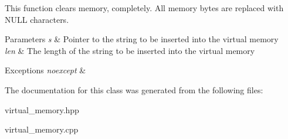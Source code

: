 This function clears memory, completely. All memory bytes are replaced with N\+U\+LL characters. 
\begin{DoxyParams}{Parameters}
{\em s} & Pointer to the string to be inserted into the virtual memory \\
\hline
{\em len} & The length of the string to be inserted into the virtual memory \\
\hline
\end{DoxyParams}

\begin{DoxyExceptions}{Exceptions}
{\em noexcept} & \\
\hline
\end{DoxyExceptions}


The documentation for this class was generated from the following files\+:\begin{DoxyCompactItemize}
\item 
virtual\+\_\+memory.\+hpp\item 
virtual\+\_\+memory.\+cpp\end{DoxyCompactItemize}
